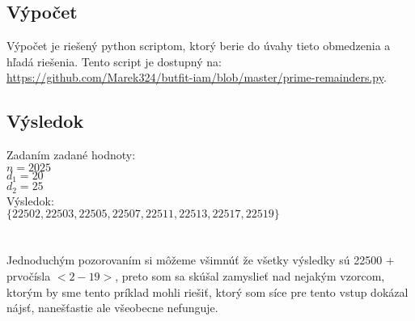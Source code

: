 \documentclass[fontsize=12pt]{article}
\begin{document}
\subsection{Výpočet}
Výpočet je riešený python scriptom, ktorý berie do úvahy tieto obmedzenia a hľadá riešenia.
Tento script je dostupný na:
\\\href{https://github.com/Marek324/butfit-iam/blob/master/prime-remainders.py}{https://github.com/Marek324/butfit-iam/blob/master/prime-remainders.py}.

\subsection{Výsledok}
Zadaním zadané hodnoty:\\
$n = 2025$\\
$d_1 = 20$\\
$d_2 = 25$\\
Výsledok:\\
$\{22502, 22503, 22505, 22507, 22511, 22513, 22517, 22519\}$\\
\\\\Jednoduchým pozorovaním si môžeme všimnúť že všetky výsledky sú 22500 + prvočísla $<2-19>$, preto som sa skúšal zamyslieť nad nejakým vzorcom, ktorým by sme tento príklad mohli riešiť, ktorý som síce pre tento vstup dokázal nájsť, nanešťastie ale všeobecne nefunguje.  
\end{document}
